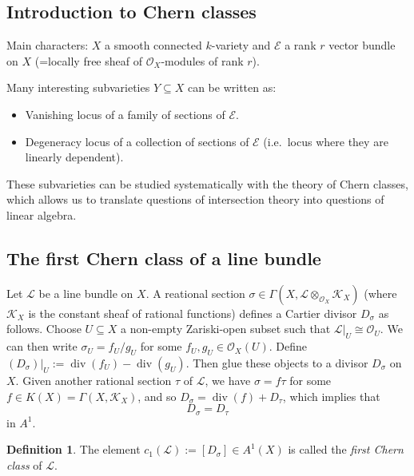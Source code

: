 \documentclass[12pt,a4paper]{amsart}
\theoremstyle{plain}
\theoremstyle{definition}
\newtheorem{defn}[thm]{Definition}
\theoremstyle{remark}
\begin{document}
\subsection{Introduction to Chern classes}

Main characters: $X$ a smooth connected $k$-variety and $\mathscr{E}$ a rank $r$ vector bundle on $X$ (=locally free sheaf of $\mathscr{O}_{X}$-modules of rank $r$).

Many interesting subvarieties $Y \subseteq X$ can be written as:

\begin{itemize}
  \item Vanishing locus of a family of sections of $\mathscr{E}$.
  \item Degeneracy locus of a collection of sections of $\mathscr{E}$ (i.e.~locus where they are linearly dependent).
\end{itemize}

These subvarieties can be studied systematically with the theory of Chern classes, which allows us to translate questions of intersection theory into questions of linear algebra.

\subsection{The  first Chern class of a line bundle}

Let $\mathscr{L}$ be a line bundle on $X$.
A reational section $\sigma \in \Gamma(X, \mathscr{L} \otimes_{\mathscr{O}_{X}} \mathscr{K}_{X})$ (where $\mathscr{K}_{X}$ is the constant sheaf of rational functions) defines a Cartier divisor $D_{\sigma}$ as follows.
Choose $U \subseteq X$ a non-empty Zariski-open subset such that $\mathscr{L}|_{U} \cong \mathscr{O}_{U}$.
We can then write $\sigma_{U} = f_{U} / g_{U}$ for some $f_{U}, g_{U} \in \mathscr{O}_{X}(U)$.
Define $(D_{\sigma})|_{U} := \operatorname{div}(f_{U}) - \operatorname{div}(g_{U})$.
Then glue these objects to a divisor $D_{\sigma}$ on $X$.
Given another rational section $\tau$ of $\mathscr{L}$, we have $\sigma = f \tau$ for some $f \in K(X) = \Gamma(X, \mathscr{K}_{X})$, and so $D_{\sigma} = \operatorname{div}(f) + D_{\tau}$, which implies that
\[ D_{\sigma} = D_{\tau} \]
in $A^{1}$.

\begin{defn}
  The element $c_{1}(\mathscr{L}) := [D_{\sigma}] \in A^{1}(X)$ is called the \textit{first Chern class} of $\mathscr{L}$.
\end{defn}
\end{document}
